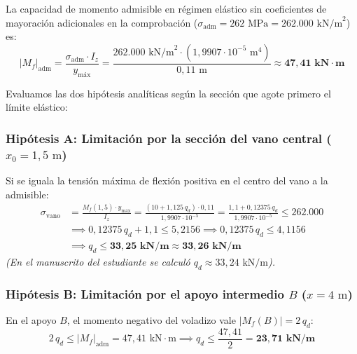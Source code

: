 
La capacidad de momento admisible en régimen elástico sin coeficientes de mayoración adicionales en la comprobación ($\sigma_{\text{adm}} = 262\text{ MPa} = 262.000\text{ kN/m}^2$) es:
\begin{equation}
    |M_f|_{\text{adm}} = \frac{\sigma_{\text{adm}} \cdot I_z}{y_{\text{máx}}} = \frac{262.000\text{ kN/m}^2 \cdot (1{,}9907 \cdot 10^{-5}\text{ m}^4)}{0{,}11\text{ m}} \approx \mathbf{47{,}41\text{ kN}\cdot\text{m}}
\end{equation}

Evaluamos las dos hipótesis analíticas según la sección que agote primero el límite elástico:

\subsubsection*{Hipótesis A: Limitación por la sección del vano central ($x_0 = 1{,}5\text{ m}$)}
Si se iguala la tensión máxima de flexión positiva en el centro del vano a la admisible:
\begin{align}
    \sigma_{\text{vano}} & = \frac{M_f(1{,}5) \cdot y_{\text{máx}}}{I_z} = \frac{(10 + 1{,}125\,q_d) \cdot 0{,}11}{1{,}9907 \cdot 10^{-5}} = \frac{1{,}1 + 0{,}12375\,q_d}{1{,}9907 \cdot 10^{-5}} \le 262.000 \nonumber \\
    & \implies 0{,}12375\,q_d + 1{,}1 \le 5{,}2156 \implies 0{,}12375\,q_d \le 4{,}1156 \nonumber \\
    & \implies \boxed{q_d \le \mathbf{33{,}25\text{ kN/m} \approx 33{,}26\text{ kN/m}}}
\end{align}
\textit{(En el manuscrito del estudiante se calculó $q_d \approx 33{,}24\text{ kN/m}$).}

\subsubsection*{Hipótesis B: Limitación por el apoyo intermedio $B$ ($x = 4\text{ m}$)}
En el apoyo $B$, el momento negativo del voladizo vale $|M_f(B)| = 2\,q_d$:
\begin{equation}
    2\,q_d \le |M_f|_{\text{adm}} = 47{,}41\text{ kN}\cdot\text{m} \implies \boxed{q_d \le \frac{47{,}41}{2} = \mathbf{23{,}71\text{ kN/m}}}
\end{equation}

